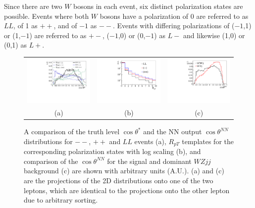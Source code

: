 \documentclass[aps,prl,twocolumn,showpacs,superscriptaddress,groupeaddress,floatfix]{revtex4}
\def\ts{\ensuremath{ \theta^{*} }\xspace}
\def\tsNN{\ensuremath{ \theta^{NN} }\xspace}
\def\cts{\ensuremath{ \cos\ts }\xspace}
\def\ctsNN{\ensuremath{ \cos\tsNN }\xspace}
\begin{document}
Since there are two $W$ bosons in each event, six distinct polarization states are possible. Events where both $W$ bosons have a polarization of 0 are referred to as $LL$, of 1 as $++$, and of $-1$ as $--$. Events with differing polarizations of ($-1$,1) or (1,$-1$) are referred to as $+-$, ($-1$,0) or (0,$-1$) as $L-$ and likewise (1,0) or (0,1) as $L+$. 

\begin{figure}
\begin{tabular}{ccc}
\includegraphics[width=.32\textwidth,height=.18\textheight]{fig_01a.pdf}&
\includegraphics[width=.32\textwidth,height=.18\textheight]{fig_01b.pdf}&
\includegraphics[width=.32\textwidth,height=.18\textheight]{fig_01c.pdf}\\
(a)&(b)&(c)\\
\end{tabular}
\caption{\label{fig:polarization_comparison} A comparison of the truth
level \cts and the NN output \ctsNN distributions for $--$, $++$ and
$LL$ events (a), $R_{pT}$ templates for the corresponding polarization
states with log scaling (b), and comparison of the \ctsNN for the
signal and dominant $WZjj$ background (c) are shown with arbitrary
units (A.U.). (a) and (c) are the projections of the 2D distributions
onto one of the two leptons, which are identical to the projections
onto the other lepton due to arbitrary sorting.}
\end{figure}
\end{document}
